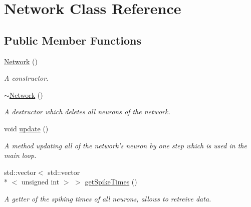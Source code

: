 \hypertarget{classNetwork}{\section{Network Class Reference}
\label{classNetwork}
}
\subsection*{Public Member Functions}
\begin{DoxyCompactItemize}
\item 
\hyperlink{classNetwork_a3cc2fb4f8fa4d507077e8da85ce5a1c8}{Network} ()
\begin{DoxyCompactList}\small\item\em A constructor. \end{DoxyCompactList}\item 
\hypertarget{classNetwork_a7a4e19cdb4bf0c7ecf82baa643831492}{\hyperlink{classNetwork_a7a4e19cdb4bf0c7ecf82baa643831492}{$\sim$\-Network} ()}\label{classNetwork_a7a4e19cdb4bf0c7ecf82baa643831492}

\begin{DoxyCompactList}\small\item\em A destructor which deletes all neurons of the network. \end{DoxyCompactList}\item 
\hypertarget{classNetwork_ab07bb6f6d9020b9eb230551083ea929f}{void \hyperlink{classNetwork_ab07bb6f6d9020b9eb230551083ea929f}{update} ()}\label{classNetwork_ab07bb6f6d9020b9eb230551083ea929f}

\begin{DoxyCompactList}\small\item\em A method updating all of the network's neuron by one step which is used in the main loop. \end{DoxyCompactList}\item 
\hypertarget{classNetwork_a618d267c0962f59027c0d063aa2b4533}{std\-::vector$<$ std\-::vector\\*
$<$ unsigned int $>$ $>$ \hyperlink{classNetwork_a618d267c0962f59027c0d063aa2b4533}{get\-Spike\-Times} ()}\label{classNetwork_a618d267c0962f59027c0d063aa2b4533}

\begin{DoxyCompactList}\small\item\em A getter of the spiking times of all neurons, allows to retreive data. \end{DoxyCompactList}\end{DoxyCompactItemize}


